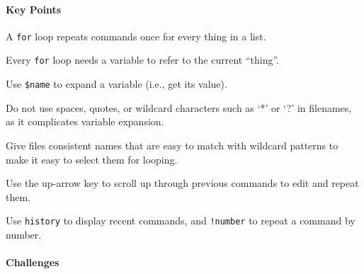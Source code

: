 \documentclass{book}
\begin{document}
\mbox{}\paragraph{Key Points}

\begin{swcitemize}
\item
  A \texttt{for} loop repeats commands once for every thing in a list.
\item
  Every \texttt{for} loop needs a variable to refer to the current
  ``thing''.
\item
  Use \texttt{\$name} to expand a variable (i.e., get its value).
\item
  Do not use spaces, quotes, or wildcard characters such as `*' or `?'
  in filenames, as it complicates variable expansion.
\item
  Give files consistent names that are easy to match with wildcard
  patterns to make it easy to select them for looping.
\item
  Use the up-arrow key to scroll up through previous commands to edit
  and repeat them.
\item
  Use \texttt{history} to display recent commands, and \texttt{!number}
  to repeat a command by number.
\end{swcitemize}

\mbox{}\paragraph{Challenges}
\end{document}
